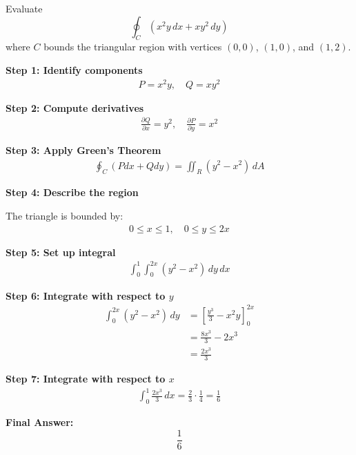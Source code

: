 \begin{examplebox}
    Evaluate
    \begin{equation*}
        \oint_C (x^2y\,dx + xy^2\,dy)
    \end{equation*}
    where $C$ bounds the triangular region with vertices $(0,0)$, $(1,0)$, and $(1,2)$.

    \textbf{Step 1: Identify components}
    \begin{align*}
        P = x^2y, \quad Q = xy^2
    \end{align*}

    \textbf{Step 2: Compute derivatives}
    \begin{align*}
        \frac{\partial Q}{\partial x} = y^2, \quad
        \frac{\partial P}{\partial y} = x^2
    \end{align*}

    \textbf{Step 3: Apply Green's Theorem}
    \begin{align*}
        \oint_C (Pdx + Qdy)
        = \iint_R (y^2 - x^2)\, dA
    \end{align*}

    \textbf{Step 4: Describe the region}

    The triangle is bounded by:
    \begin{align*}
        0 \le x \le 1, \quad 0 \le y \le 2x
    \end{align*}

    \textbf{Step 5: Set up integral}
    \begin{align*}
        \int_0^1 \int_0^{2x} (y^2 - x^2)\, dy\, dx
    \end{align*}

    \textbf{Step 6: Integrate with respect to $y$}
    \begin{align*}
        \int_0^{2x} (y^2 - x^2)\,dy
         & = \left[\frac{y^3}{3} - x^2 y \right]_0^{2x} \\
         & = \frac{8x^3}{3} - 2x^3                      \\
         & = \frac{2x^3}{3}
    \end{align*}

    \textbf{Step 7: Integrate with respect to $x$}
    \begin{align*}
        \int_0^1 \frac{2x^3}{3}\,dx
        = \frac{2}{3}\cdot \frac{1}{4}
        = \frac{1}{6}
    \end{align*}

    \textbf{Final Answer:}
    \begin{equation*}
        \boxed{\frac{1}{6}}
    \end{equation*}
\end{examplebox}

